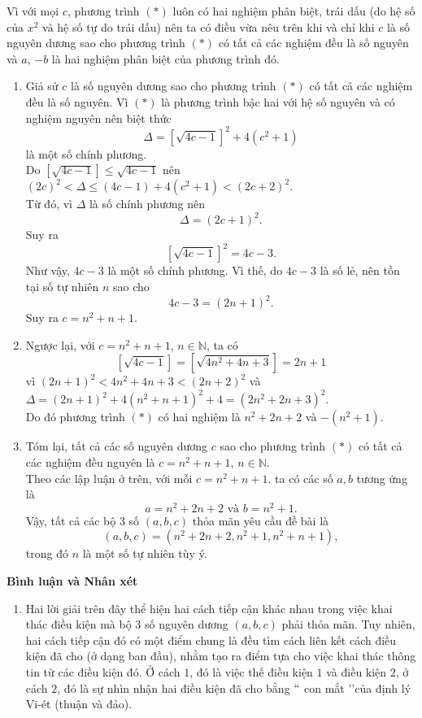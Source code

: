 \begin{bt}
{		Vì với mọi $c$, phương trình $(*)$ luôn có hai nghiệm phân biệt, trái dấu (do hệ số của $x^2$ và hệ số tự do trái dấu) nên ta có điều vừa nêu trên khi và chỉ khi $c$ là số nguyên dương sao cho phương trình $(*)$ có tất cả các nghiệm đều là số nguyên và $a$, $-b$ là hai nghiệm phân biệt của phương trình đó.
		\begin{enumerate}
			\item Giả sử $c$ là số nguyên dương sao cho phương trình $(*)$ có tất cả các nghiệm đều là số nguyên. Vì $(*)$ là phương trình bậc hai với hệ số nguyên và có nghiệm nguyên nên biệt thức
			$$\Delta = \left[\sqrt{4c - 1}\right]^2 + 4(c^2 + 1)$$
			là một số chính phương.\\
			Do $\left[\sqrt{4c - 1}\right] \leq \sqrt{4c - 1}$ nên $(2c)^2 < \Delta \leq (4c - 1) + 4(c^2 + 1) < (2c + 2)^2$.\\
			Từ đó, vì $\Delta$ là số chính phương nên
			$$\Delta = (2c + 1)^2.$$
			Suy ra
			$$\left[\sqrt{4c - 1}\right]^2 = 4c - 3.$$
			Như vậy, $4c - 3$ là một số chính phương. Vì thế, do $4c - 3$ là số lẻ, nên tồn tại số tự nhiên $n$ sao cho
			$$4c - 3 = (2n + 1)^2.$$
			Suy ra $c = n^2 + n + 1$.
			\item Ngược lại, với $c = n^2 + n + 1$, $n \in \mathbb{N}$, ta có
			$$\left[ \sqrt{4c-1}\right]=\left[ \sqrt{4n^2+4n+3}\right]=2n+1$$
			vì $(2n+1)^2 < 4n^2+4n+3 < (2n+2)^2$ và
			$\Delta=(2n+1)^2+4(n^2+n+1)^2+4=(2n^2+2n+3)^2.$\\
			Do đó phương trình $(*)$ có hai nghiệm là $n^2+2n+2$ và $-(n^2+1)$.
			\item Tóm lại, tất cả các số nguyên dương $c$ sao cho phương trình $(*)$ có tất cả các nghiệm đều nguyên là $c=n^2+n+1$, $n \in \mathbb{N}.$\\
			Theo các lập luận ở trên, với mỗi $c=n^2+n+1$. ta có các số $a,b$ tương ứng là
			$$a=n^2+2n+2 \text{ và } b=n^2+1.$$
			Vậy, tất cả các bộ $3$ số $(a,b,c)$ thỏa mãn yêu cầu đề bài là $$(a,b,c)=(n^2+2n+2,n^2+1,n^2+n+1),$$
			trong đó $n$ là một số tự nhiên tùy ý.
		\end{enumerate}
\textbf{Bình luận và Nhân xét}
\begin{enumerate}
	\item Hai lời giải trên đây thể hiện hai cách tiếp cận khác nhau trong việc khai thác điều kiện mà bộ $3$ số nguyên dương $(a,b,c)$ phải thỏa mãn. Tuy nhiên, hai cách tiếp cận đó có một điểm chung là đều tìm cách liên kết cách điều kiện đã cho (ở dạng ban đầu), nhằm tạo ra điểm tựa cho việc khai thác thông tin từ các điều kiện đó. Ở cách $1$, đó là việc thế điều kiện $1$ và điều kiện $2$, ở cách $2$, đó là sự nhìn nhận hai điều kiện đã cho bằng $\lq \lq$ con mắt \rq \rq của định lý Vi-ét (thuận và đảo).

\end{enumerate}}
\end{bt}
